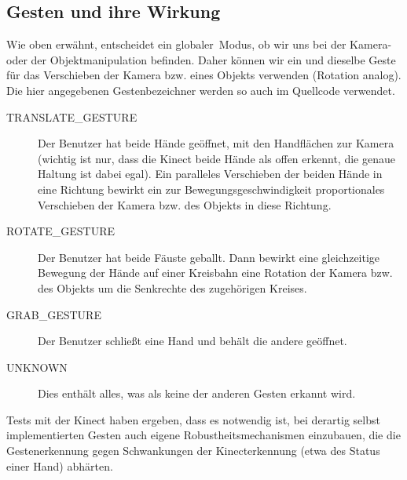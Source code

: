 \subsection{Gesten und ihre Wirkung}
	Wie oben erwähnt, entscheidet ein \glqq globaler\grqq\ Modus, ob wir uns bei der Kamera- oder der Objektmanipulation befinden. Daher können wir ein und dieselbe Geste für das Verschieben der Kamera bzw. eines Objekts verwenden (Rotation analog). Die hier angegebenen Gestenbezeichner werden so auch im Quellcode verwendet.
	\begin{description}
		\item[TRANSLATE\_GESTURE] Der Benutzer hat beide Hände geöffnet, mit den Handflächen zur Kamera (wichtig ist nur, dass die Kinect beide Hände als offen erkennt, die genaue Haltung ist dabei egal). Ein paralleles Verschieben der beiden Hände in eine Richtung bewirkt ein zur Bewegungsgeschwindigkeit proportionales Verschieben der Kamera bzw. des Objekts in diese Richtung.
		\item[ROTATE\_GESTURE] Der Benutzer hat beide Fäuste geballt. Dann bewirkt eine gleichzeitige Bewegung der Hände auf einer Kreisbahn eine Rotation der Kamera bzw. des Objekts um die Senkrechte des zugehörigen Kreises.
		\item[GRAB\_GESTURE] Der Benutzer schließt eine Hand und behält die andere geöffnet.
		\item[UNKNOWN] Dies enthält alles, was als keine der anderen Gesten erkannt wird.
	\end{description}
	Tests mit der Kinect haben ergeben, dass es notwendig ist, bei derartig selbst implementierten Gesten auch eigene Robustheitsmechanismen einzubauen, die die Gestenerkennung gegen Schwankungen der Kinecterkennung (etwa des Status einer Hand) abhärten.
